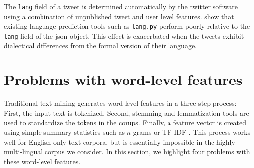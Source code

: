 \documentclass[sigconf,10pt]{acmart}
\newcommand{\str}[1]{\texttt{#1}}
\begin{document}
The \str{lang} field of a tweet is determined automatically by the twitter software using a combination of unpublished tweet and user level features.
\citet{blodgett2016demographic} show that existing language prediction tools such as \str{lang.py} \citep{lui2012langid} perform poorly relative to the \str{lang} field of the json object.
This effect is exacerbated when the tweets exhibit dialectical differences from the formal version of their language.

%

\section{Problems with word-level features}

%

Traditional text mining generates word level features in a three step process:
First, the input text is tokenized.
Second, stemming and lemmatization tools are used to standardize the tokens in the corups.
Finally, a feature vector is created using simple summary statistics such as $n$-grams or TF-IDF \citep{}.
This process works well for English-only text corpora,
but is essentially impossible in the highly multi-lingual corpus we consider.
In this section, we highlight four problems with these word-level features.
\end{document}
